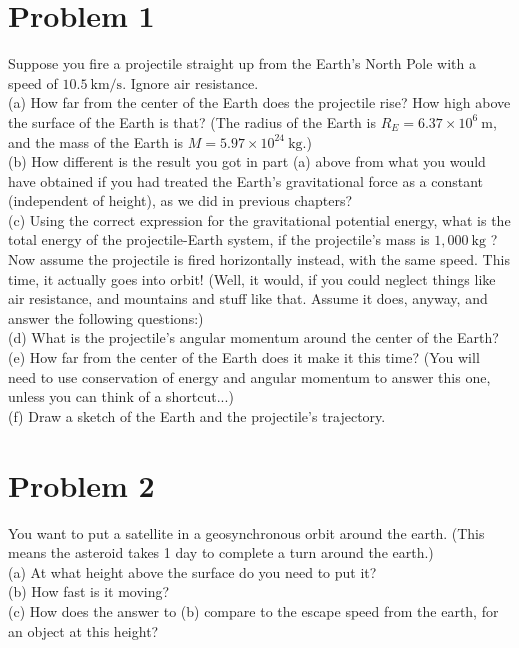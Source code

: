 \documentclass[10pt]{article}
\begin{document}
\section*{Problem 1}
Suppose you fire a projectile straight up from the Earth's North Pole with a speed of $10.5 \mathrm{~km} / \mathrm{s}$. Ignore air resistance.\\
(a) How far from the center of the Earth does the projectile rise? How high above the surface of the Earth is that? (The radius of the Earth is $R_{E}=6.37 \times 10^{6} \mathrm{~m}$, and the mass of the Earth is $M=5.97 \times 10^{24} \mathrm{~kg}$.)\\
(b) How different is the result you got in part (a) above from what you would have obtained if you had treated the Earth's gravitational force as a constant (independent of height), as we did in previous chapters?\\
(c) Using the correct expression for the gravitational potential energy, what is the total energy of the projectile-Earth system, if the projectile's mass is $1,000 \mathrm{~kg}$ ?\\
Now assume the projectile is fired horizontally instead, with the same speed. This time, it actually goes into orbit! (Well, it would, if you could neglect things like air resistance, and mountains and stuff like that. Assume it does, anyway, and answer the following questions:)\\
(d) What is the projectile's angular momentum around the center of the Earth?\\
(e) How far from the center of the Earth does it make it this time? (You will need to use conservation of energy and angular momentum to answer this one, unless you can think of a shortcut...)\\
(f) Draw a sketch of the Earth and the projectile's trajectory.

\section*{Problem 2}
You want to put a satellite in a geosynchronous orbit around the earth. (This means the asteroid takes 1 day to complete a turn around the earth.)\\
(a) At what height above the surface do you need to put it?\\
(b) How fast is it moving?\\
(c) How does the answer to (b) compare to the escape speed from the earth, for an object at this height?
\end{document}
